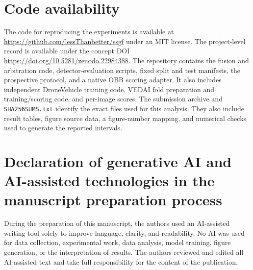 \documentclass[preprint,11pt]{elsarticle}
\begin{document}
\section*{Code availability}

The code for reproducing the experiments is available at
\url{https://github.com/lessThanbetter/ssgf} under an MIT license. The
project-level record is available under the concept DOI
\url{https://doi.org/10.5281/zenodo.22984388}. The repository contains the
fusion and arbitration code, detector-evaluation scripts, fixed split and test
manifests, the prospective protocol, and a native OBB scoring adapter. It also
includes independent DroneVehicle training code, VEDAI fold preparation and
training/scoring code, and per-image scores. The submission archive and
\texttt{SHA256SUMS.txt} identify the exact files used for this analysis. They
also include result tables, figure source data, a figure-number mapping, and
numerical checks used to generate the reported intervals.

\section*{Declaration of generative AI and AI-assisted technologies in the
manuscript preparation process}

During the preparation of this manuscript, the authors used an AI-assisted
writing tool solely to improve language, clarity, and readability. No AI was
used for data collection, experimental work, data analysis, model training,
figure generation, or the interpretation of results. The authors reviewed and
edited all AI-assisted text and take full responsibility for the content of the
publication.

\begingroup
\footnotesize


\endgroup
\end{document}
